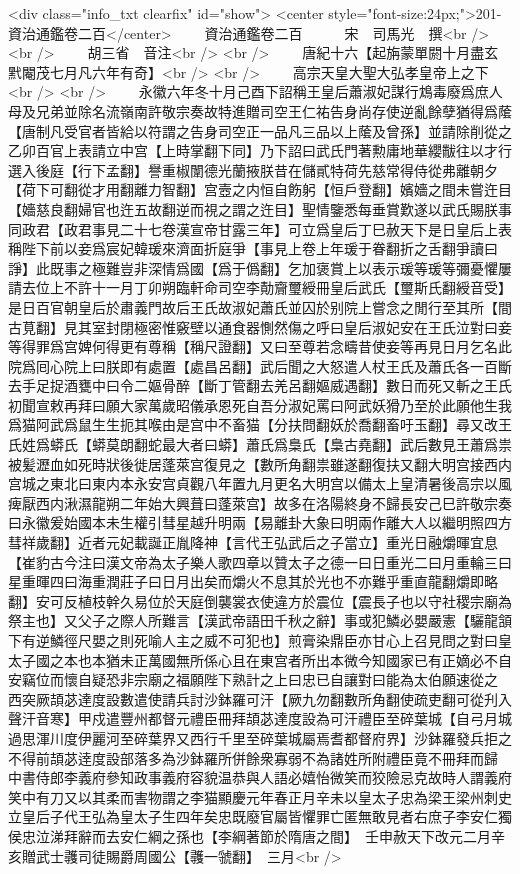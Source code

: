 <div class="info_txt clearfix" id="show">
<center style="font-size:24px;">201-資治通鑑卷二百</center>
  　　資治通鑑卷二百　　　宋　司馬光　撰<br />
<br />
　　胡三省　音注<br />
<br />
　　唐紀十六【起旃蒙單閼十月盡玄黓閹茂七月凡六年有奇】<br />
<br />
　　高宗天皇大聖大弘孝皇帝上之下<br />
<br />
　　永徽六年冬十月己酉下詔稱王皇后蕭淑妃謀行鴆毒廢爲庶人母及兄弟並除名流嶺南許敬宗奏故特進贈司空王仁祐告身尚存使逆亂餘孽猶得爲䕃【唐制凡受官者皆給以符謂之告身司空正一品凡三品以上䕃及曾孫】並請除削從之乙卯百官上表請立中宫【上時掌翻下同】乃下詔曰武氏門著勲庸地華纓黻往以才行選入後庭【行下孟翻】譽重椒闈德光蘭掖朕昔在儲貳特荷先慈常得侍從弗離朝夕【荷下可翻從才用翻離力智翻】宫壼之内恒自飭躬【恒戶登翻】嬪嬙之間未嘗迕目【嬙慈良翻婦官也迕五故翻逆而視之謂之迕目】聖情鑒悉每垂賞歎遂以武氏賜朕事同政君【政君事見二十七卷漢宣帝甘露三年】可立爲皇后丁巳赦天下是日皇后上表稱陛下前以妾爲宸妃韓瑗來濟面折庭爭【事見上卷上年瑗于眷翻折之舌翻爭讀曰諍】此既事之極難豈非深情爲國【爲于僞翻】乞加褒賞上以表示瑗等瑗等彌憂懼屢請去位上不許十一月丁卯朔臨軒命司空李勣齎璽綬冊皇后武氏【璽斯氏翻綬音受】是日百官朝皇后於肅義門故后王氏故淑妃蕭氏並囚於别院上嘗念之閒行至其所【間古莧翻】見其室封閉極密惟竅壁以通食器惻然傷之呼曰皇后淑妃安在王氏泣對曰妾等得罪爲宫婢何得更有尊稱【稱尺證翻】又曰至尊若念疇昔使妾等再見日月乞名此院爲囘心院上曰朕即有處置【處昌呂翻】武后聞之大怒遣人杖王氏及蕭氏各一百斷去手足捉酒甕中曰令二嫗骨醉【斷丁管翻去羌呂翻嫗威遇翻】數日而死又斬之王氏初聞宣敕再拜曰願大家萬歲昭儀承恩死自吾分淑妃罵曰阿武妖猾乃至於此願他生我爲猫阿武爲鼠生生扼其喉由是宫中不畜猫【分扶問翻妖於喬翻畜吁玉翻】尋又改王氏姓爲蟒氏【蟒莫朗翻蛇最大者曰蟒】蕭氏爲梟氏【梟古堯翻】武后數見王蕭爲祟被髪瀝血如死時狀後徙居蓬萊宫復見之【數所角翻祟雖遂翻復扶又翻大明宫接西内宫城之東北曰東内本永安宫貞觀八年置九月更名大明宫以備太上皇清暑後高宗以風痺厭西内湫濕龍朔二年始大興葺曰蓬萊宫】故多在洛陽終身不歸長安己巳許敬宗奏曰永徽爰始國本未生權引彗星越升明兩【易離卦大象曰明兩作離大人以繼明照四方彗祥歲翻】近者元妃載誕正胤降神【言代王弘武后之子當立】重光日融爝暉宜息【崔豹古今注曰漢文帝為太子樂人歌四章以贊太子之德一曰日重光二曰月重輪三曰星重暉四曰海重潤莊子曰日月出矣而爝火不息其於光也不亦難乎重直龍翻爝即略翻】安可反植枝幹久易位於天庭倒襲裳衣使違方於震位【震長子也以守社稷宗廟為祭主也】又父子之際人所難言【漢武帝語田千秋之辭】事或犯鱗必嬰嚴憲【驪龍頷下有逆鱗徑尺嬰之則死喻人主之威不可犯也】煎膏染鼎臣亦甘心上召見問之對曰皇太子國之本也本猶未正萬國無所係心且在東宫者所出本微今知國家已有正嫡必不自安竊位而懷自疑恐非宗廟之福願陛下熟計之上曰忠已自讓對曰能為太伯願速從之　西突厥頡苾達度設數遣使請兵討沙鉢羅可汗【厥九勿翻數所角翻使疏吏翻可從刋入聲汗音寒】甲戍遣豐州都督元禮臣冊拜頡苾達度設為可汗禮臣至碎葉城【自弓月城過思渾川度伊麗河至碎葉界又西行千里至碎葉城屬焉耆都督府界】沙鉢羅發兵拒之不得前頡苾逹度設部落多為沙鉢羅所併餘衆寡弱不為諸姓所附禮臣竟不冊拜而歸　中書侍郎李義府參知政事義府容貌温恭與人語必嬉怡微笑而狡險忌克故時人謂義府笑中有刀又以其柔而害物謂之李猫顯慶元年春正月辛未以皇太子忠為梁王梁州刺史立皇后子代王弘為皇太子生四年矣忠既廢官屬皆懼罪亡匿無敢見者右庶子李安仁獨侯忠泣涕拜辭而去安仁綱之孫也【李綱著節於隋唐之間】　壬申赦天下改元二月辛亥贈武士彠司徒賜爵周國公【彠一虢翻】　三月<br />
